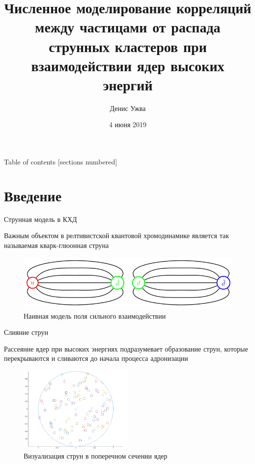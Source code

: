 \documentclass[aspectratio=43]{beamer}
\title[]{Численное моделирование корреляций между частицами от распада струнных кластеров при взаимодействии ядер высоких энергий}
\date{4 июня 2019}
\author[]{Денис Ужва}
\institute[]{СПбГУ, кафедра физики высоких энергий и элементарных частиц}
\begin{document}
\maketitle

\begin{frame}{Table of contents}
  [sections numbered]
  \tableofcontents[hideallsubsections]
\end{frame}



\section{Введение}

\begin{frame}{Струнная модель в КХД}
	
	Важным объектом в релтивистской квантовой хромодинамике является так называемая кварк-глюонная струна
	\begin{figure}[H]
		\includegraphics[width=\textwidth]{string}
		\caption*{Наивная модель поля сильного взаимодействии}
		\label{fig:fluctuations}
	\end{figure}

\end{frame}

\begin{frame}{Слияние струн}
	
	Рассеяние ядер при высоких энергиях подразумевает образование струн, которые перекрываются и сливаются до начала процесса адронизации
	\begin{figure}[H]
		\includegraphics[width=0.5\textwidth]{interactionarea}
		\caption*{Визуализация струн в поперечном сечении ядер}
		\label{fig:interactionarea}
	\end{figure}

\end{frame}
\end{document}
